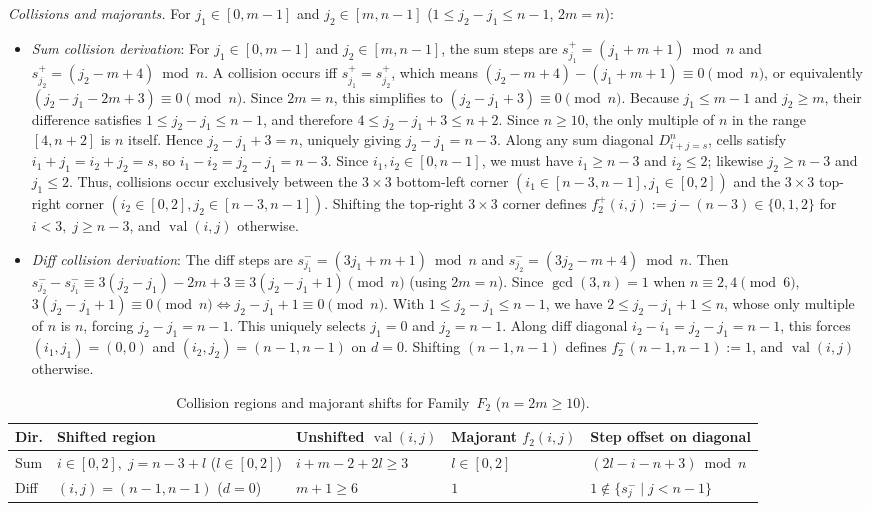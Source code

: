 \documentclass[10pt,a4paper]{article}
\theoremstyle{remark}
\newcommand{\val}{\operatorname{val}}
\begin{document}
\emph{Collisions and majorants.}
For $j_1 \in [0,m-1]$ and $j_2 \in [m,n-1]$ ($1 \le j_2 - j_1 \le n - 1$, $2m = n$):
\begin{itemize}[nosep]
  \item \emph{Sum collision derivation}: For $j_1 \in [0,m-1]$ and $j_2 \in [m,n-1]$, the sum steps are
  $s^+_{j_1} = (j_1 + m + 1) \bmod n$ and $s^+_{j_2} = (j_2 - m + 4) \bmod n$. A collision occurs iff
  $s^+_{j_1} = s^+_{j_2}$, which means $(j_2 - m + 4) - (j_1 + m + 1) \equiv 0 \pmod n$, or equivalently
  $(j_2 - j_1 - 2m + 3) \equiv 0 \pmod n$. Since $2m = n$, this simplifies to $(j_2 - j_1 + 3) \equiv 0 \pmod n$.
  Because $j_1 \le m - 1$ and $j_2 \ge m$, their difference satisfies $1 \le j_2 - j_1 \le n - 1$, and therefore
  $4 \le j_2 - j_1 + 3 \le n + 2$. Since $n \ge 10$, the only multiple of $n$ in the range $[4, n + 2]$ is $n$
  itself. Hence $j_2 - j_1 + 3 = n$, uniquely giving $j_2 - j_1 = n - 3$.
  Along any sum diagonal $D^n_{i+j=s}$, cells satisfy $i_1 + j_1 = i_2 + j_2 = s$, so
  $i_1 - i_2 = j_2 - j_1 = n - 3$. Since $i_1, i_2 \in [0,n-1]$, we must have $i_1 \ge n - 3$ and $i_2 \le 2$;
  likewise $j_2 \ge n - 3$ and $j_1 \le 2$. Thus, collisions occur exclusively between the $3 \times 3$
  bottom-left corner $(i_1 \in [n-3,n-1], j_1 \in [0,2])$ and the $3 \times 3$ top-right corner
  $(i_2 \in [0,2], j_2 \in [n-3,n-1])$. Shifting the top-right $3 \times 3$ corner defines
  $f^+_2(i,j) := j - (n - 3) \in \{0, 1, 2\}$ for $i < 3, \; j \ge n - 3$, and $\val(i,j)$ otherwise.
  \item \emph{Diff collision derivation}: The diff steps are $s^-_{j_1} = (3j_1 + m + 1) \bmod n$ and
  $s^-_{j_2} = (3j_2 - m + 4) \bmod n$. Then $s^-_{j_2} - s^-_{j_1} \equiv 3(j_2 - j_1) - 2m + 3 \equiv 3(j_2 - j_1 + 1) \pmod n$
  (using $2m = n$). Since $\gcd(3,n) = 1$ when $n \equiv 2,4 \pmod 6$, $3(j_2 - j_1 + 1) \equiv 0 \pmod n \iff
  j_2 - j_1 + 1 \equiv 0 \pmod n$. With $1 \le j_2 - j_1 \le n - 1$, we have $2 \le j_2 - j_1 + 1 \le n$, whose only
  multiple of $n$ is $n$, forcing $j_2 - j_1 = n - 1$. This uniquely selects $j_1 = 0$ and $j_2 = n - 1$.
  Along diff diagonal $i_2 - i_1 = j_2 - j_1 = n - 1$, this forces $(i_1,j_1) = (0,0)$ and $(i_2,j_2) = (n-1,n-1)$
  on $d = 0$. Shifting $(n-1,n-1)$ defines $f^-_2(n-1,n-1) := 1$, and $\val(i,j)$ otherwise.
\end{itemize}

\begin{table}[htbp]
\centering
\footnotesize
\begin{tabular}{@{}lllll@{}}
\toprule
Dir. & Shifted region & Unshifted $\val(i,j)$ & Majorant $f_2(i,j)$ & Step offset on diagonal \\
\midrule
Sum & $i \in [0,2], \; j = n - 3 + l$ ($l \in [0,2]$) & $i + m - 2 + 2l \ge 3$ & $l \in [0,2]$ & $(2l - i - n + 3) \bmod n$ \\
Diff & $(i,j) = (n-1,n-1)$ ($d = 0$) & $m + 1 \ge 6$ & $1$ & $1 \notin \{s^-_j \mid j < n-1\}$ \\
\bottomrule
\end{tabular}
\caption{Collision regions and majorant shifts for Family~$F_2$ ($n = 2m \ge 10$).}
\label{tab:fam2}
\end{table}
\end{document}
